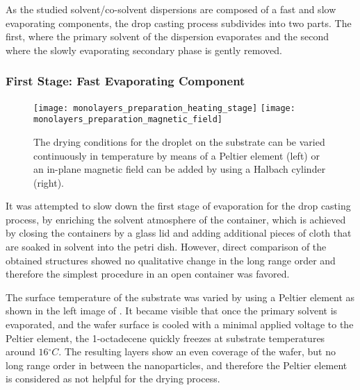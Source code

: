 \documentclass[\main/dresen_thesis.tex]{subfiles}
\begin{document}
  As the studied solvent/co-solvent dispersions are composed of a fast and slow evaporating components, the drop casting process subdivides into two parts.
  The first, where the primary solvent of the dispersion evaporates and the second where the slowly evaporating secondary phase is gently removed.

  \subsubsection{First Stage: Fast Evaporating Component}
    \begin{figure}[tb]
      \centering
      \texttt{[image: monolayers\_preparation\_heating\_stage]}
      \texttt{[image: monolayers\_preparation\_magnetic\_field]}
      \caption{\label{fig:monolayers:preparation:dryingConditions:varyConditions}The drying conditions for the droplet on the substrate can be varied continuously in temperature by means of a Peltier element (left) or an in-plane magnetic field can be added by using a Halbach cylinder (right).}
    \end{figure}
    It was attempted to slow down the first stage of evaporation for the drop casting process, by enriching the solvent atmosphere of the container, which is achieved by closing the containers by a glass lid and adding additional pieces of cloth that are soaked in solvent into the petri dish. %
    However, direct comparison of the obtained structures showed no qualitative change in the long range order and therefore the simplest procedure in an open container was favored.

    The surface temperature of the substrate was varied by using a Peltier element as shown in the left image of . %
    It became visible that once the primary solvent is evaporated, and the wafer surface is cooled with a minimal applied voltage to the Peltier element, the 1-octadecene quickly freezes at substrate temperatures around $16 \unit{^\circ C}$.
    The resulting layers show an even coverage of the wafer, but no long range order in between the nanoparticles, and therefore the Peltier element is considered as not helpful for the drying process.
\end{document}
